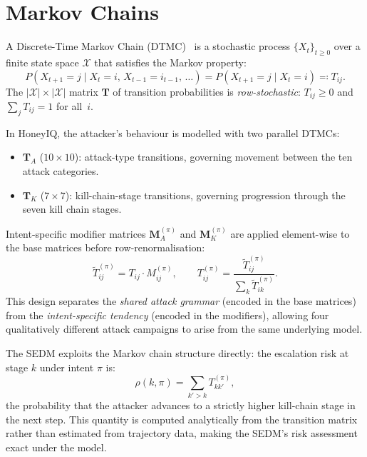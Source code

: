 \section{Markov Chains}
\label{sec:bg_markov}

A Discrete-Time Markov Chain (DTMC)~\citep{norris1998markov} is a stochastic
process $\{X_t\}_{t \geq 0}$ over a finite state space $\mathcal{X}$ that
satisfies the Markov property:
%
\begin{equation}
  P(X_{t+1} = j \mid X_t = i,\, X_{t-1} = i_{t-1},\, \ldots)
  = P(X_{t+1} = j \mid X_t = i) \eqqcolon T_{ij}.
\end{equation}
%
The $|\mathcal{X}| \times |\mathcal{X}|$ matrix $\mathbf{T}$ of transition
probabilities is \emph{row-stochastic}: $T_{ij} \geq 0$ and
$\sum_j T_{ij} = 1$ for all~$i$.

In HoneyIQ, the attacker's behaviour is modelled with two parallel DTMCs:
%
\begin{itemize}
  \item $\mathbf{T}_A$ ($10 \times 10$): attack-type transitions, governing
        movement between the ten attack categories.
  \item $\mathbf{T}_K$ ($7 \times 7$): kill-chain-stage transitions,
        governing progression through the seven kill chain stages.
\end{itemize}

Intent-specific modifier matrices $\mathbf{M}_A^{(\pi)}$ and
$\mathbf{M}_K^{(\pi)}$ are applied element-wise to the base matrices before
row-renormalisation:
%
\begin{equation}
  \tilde{T}^{(\pi)}_{ij} = T_{ij} \cdot M^{(\pi)}_{ij}, \qquad
  T^{(\pi)}_{ij} = \frac{\tilde{T}^{(\pi)}_{ij}}{\sum_k \tilde{T}^{(\pi)}_{ik}}.
\end{equation}
%
This design separates the \emph{shared attack grammar} (encoded in the base
matrices) from the \emph{intent-specific tendency} (encoded in the modifiers),
allowing four qualitatively different attack campaigns to arise from the
same underlying model.

The SEDM exploits the Markov chain structure directly: the escalation risk
at stage $k$ under intent $\pi$ is:
%
\begin{equation}
  \rho(k, \pi) = \sum_{k' > k} T^{(\pi)}_{kk'},
  \label{eq:esc_risk}
\end{equation}
%
the probability that the attacker advances to a strictly higher kill-chain
stage in the next step.
This quantity is computed analytically from the transition matrix rather than
estimated from trajectory data, making the SEDM's risk assessment exact under
the model.

